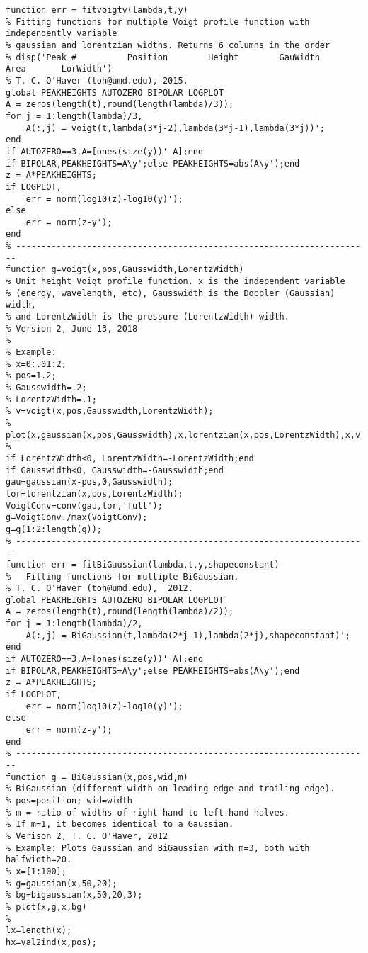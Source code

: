 \begin{lstlisting}
function err = fitvoigtv(lambda,t,y)
% Fitting functions for multiple Voigt profile function with independently variable
% gaussian and lorentzian widths. Returns 6 columns in the order
% disp('Peak #          Position        Height        GauWidth          Area       LorWidth')
% T. C. O'Haver (toh@umd.edu), 2015.
global PEAKHEIGHTS AUTOZERO BIPOLAR LOGPLOT
A = zeros(length(t),round(length(lambda)/3));
for j = 1:length(lambda)/3,
    A(:,j) = voigt(t,lambda(3*j-2),lambda(3*j-1),lambda(3*j))';
end
if AUTOZERO==3,A=[ones(size(y))' A];end
if BIPOLAR,PEAKHEIGHTS=A\y';else PEAKHEIGHTS=abs(A\y');end
z = A*PEAKHEIGHTS;
if LOGPLOT,
    err = norm(log10(z)-log10(y)');
else
    err = norm(z-y');
end
% ----------------------------------------------------------------------
function g=voigt(x,pos,Gausswidth,LorentzWidth)
% Unit height Voigt profile function. x is the independent variable
% (energy, wavelength, etc), Gausswidth is the Doppler (Gaussian) width,
% and LorentzWidth is the pressure (LorentzWidth) width. 
% Version 2, June 13, 2018
%
% Example:
% x=0:.01:2;
% pos=1.2;
% Gausswidth=.2;
% LorentzWidth=.1;
% v=voigt(x,pos,Gausswidth,LorentzWidth);
% plot(x,gaussian(x,pos,Gausswidth),x,lorentzian(x,pos,LorentzWidth),x,v)
%
if LorentzWidth<0, LorentzWidth=-LorentzWidth;end
if Gausswidth<0, Gausswidth=-Gausswidth;end
gau=gaussian(x-pos,0,Gausswidth);
lor=lorentzian(x,pos,LorentzWidth);
VoigtConv=conv(gau,lor,'full');
g=VoigtConv./max(VoigtConv);
g=g(1:2:length(g));
% ----------------------------------------------------------------------
function err = fitBiGaussian(lambda,t,y,shapeconstant)
%   Fitting functions for multiple BiGaussian.
% T. C. O'Haver (toh@umd.edu),  2012.
global PEAKHEIGHTS AUTOZERO BIPOLAR LOGPLOT
A = zeros(length(t),round(length(lambda)/2));
for j = 1:length(lambda)/2,
    A(:,j) = BiGaussian(t,lambda(2*j-1),lambda(2*j),shapeconstant)';
end
if AUTOZERO==3,A=[ones(size(y))' A];end
if BIPOLAR,PEAKHEIGHTS=A\y';else PEAKHEIGHTS=abs(A\y');end
z = A*PEAKHEIGHTS;
if LOGPLOT,
    err = norm(log10(z)-log10(y)');
else
    err = norm(z-y');
end
% ----------------------------------------------------------------------
function g = BiGaussian(x,pos,wid,m)
% BiGaussian (different width on leading edge and trailing edge).
% pos=position; wid=width 
% m = ratio of widths of right-hand to left-hand halves.
% If m=1, it becomes identical to a Gaussian.
% Verison 2, T. C. O'Haver, 2012
% Example: Plots Gaussian and BiGaussian with m=3, both with halfwidth=20.
% x=[1:100];
% g=gaussian(x,50,20);
% bg=bigaussian(x,50,20,3);
% plot(x,g,x,bg)
%
lx=length(x);
hx=val2ind(x,pos);

\end{lstlisting}
